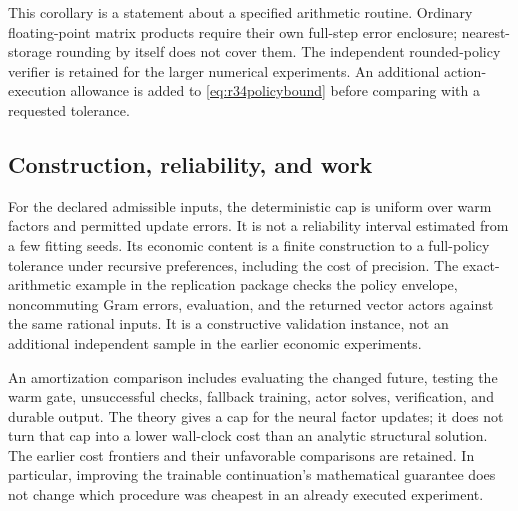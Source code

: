 This corollary is a statement about a specified arithmetic routine. Ordinary
floating-point matrix products require their own full-step error enclosure;
nearest-storage rounding by itself does not cover them. The independent
rounded-policy verifier is retained for the larger numerical experiments.
An additional action-execution allowance is added to
\eqref{eq:r34policybound} before comparing with a requested tolerance.

\subsection{Construction, reliability, and work}
For the declared admissible inputs, the deterministic cap is uniform over
warm factors and permitted update errors. It is not a reliability interval
estimated from a few fitting seeds. Its economic content is a finite
construction to a full-policy tolerance under recursive preferences,
including the cost of precision. The exact-arithmetic example in the
replication package checks the policy envelope, noncommuting Gram errors,
evaluation, and the returned vector actors against the same rational inputs.
It is a constructive validation instance, not an additional independent
sample in the earlier economic experiments.

An amortization comparison includes evaluating the changed future, testing
the warm gate, unsuccessful checks, fallback training, actor solves,
verification, and durable output. The theory gives a cap for the neural
factor updates; it does not turn that cap into a lower wall-clock cost than
an analytic structural solution. The earlier cost frontiers and their
unfavorable comparisons are retained. In particular, improving the trainable
continuation's mathematical guarantee does not change which procedure was
cheapest in an already executed experiment.
